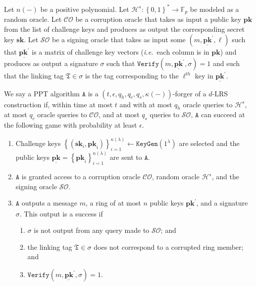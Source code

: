 \documentclass[draft]{llncs} %
\begin{document}
\begin{definition}\label{def:unforgeability}
Let $n(-)$ be a positive polynomial. Let $\mathcal{H}^s:\left\{0,1\right\}^* \to \mathbb{F}_p$ be modeled as a random oracle. Let $\mathcal{CO}$ be a corruption oracle that takes as input a public key $\textbf{pk}$ from the list of challenge keys and produces as output the corresponding secret key $\textbf{sk}$. Let $\mathcal{SO}$ be a signing oracle that takes as input some $(m, \underline{\textbf{pk}}^\prime, \ell)$ such that $\underline{\textbf{pk}^\prime}$ is a matrix of challenge key vectors (\textit{i.e.}\ each column is in $\textbf{pk}$) and produces as output a signature $\sigma$ such that $\texttt{Verify}(m, \underline{\textbf{pk}}^\prime, \sigma) = 1$ and such that the linking tag $\mathfrak{T} \in \sigma$ is the tag corresponding to the $\ell^{th}$ key in $\underline{\textbf{pk}}^\prime$.

We say a PPT algorithm $\texttt{A}$  is a $(t, \epsilon, q_h, q_c, q_s,  \kappa(-))$-forger of a $d$-LRS construction if, within time at most $t$ and with at most $q_h$ oracle queries to $\mathcal{H}^s$, at most $q_c$ oracle queries to $\mathcal{CO}$, and at most $q_s$ queries to $\mathcal{SO}$, $\texttt{A}$ can succeed at the following game with probability at least $\epsilon$.
\begin{enumerate}
\item Challenge keys $\left\{(\textbf{sk}_i, \textbf{pk}_i)\right\}_{i=1}^{\kappa(\lambda)} \leftarrow \texttt{KeyGen}(1^\lambda)$ are selected and the public keys $\underline{\textbf{pk}} = \left\{\textbf{pk}_i\right\}_{i=1}^{n(\lambda)}$ are sent to $\texttt{A}$.

\item $\texttt{A}$ is granted access to a corruption oracle $\mathcal{CO}$, random oracle $\mathcal{H}^s$, and the signing oracle $\mathcal{SO}$.

\item $\texttt{A}$ outputs a message $m$, a ring of at most $n$ public keys $\underline{\textbf{pk}}^\prime$, and a signature $\sigma$. This output is a success if
\begin{enumerate}
\item $\sigma$ is not output from any query made to $\mathcal{SO}$; and

\item the linking tag $\mathfrak{T} \in \sigma$ does not correspond to a corrupted ring member; and

\item $\texttt{Verify}(m, \underline{\textbf{pk}}^\prime, \sigma) = 1$.
\end{enumerate}
\end{enumerate}
\end{definition}
\end{document}
